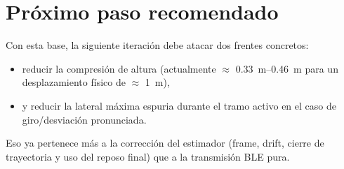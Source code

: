 ﻿\documentclass[11pt,a4paper]{article}
\begin{document}
\section*{Pr\'oximo paso recomendado}
Con esta base, la siguiente iteraci\'on debe atacar dos frentes concretos:
\begin{itemize}[leftmargin=14pt]
  \item reducir la compresi\'on de altura (actualmente \(\approx\) \SIrange{0,33}{0,46}{m} para un desplazamiento f\'isico de \(\approx\) \SI{1}{m}),
  \item y reducir la lateral m\'axima espuria durante el tramo activo en el caso de giro/desviaci\'on pronunciada.
\end{itemize}

Eso ya pertenece m\'as a la correcci\'on del estimador (frame, drift, cierre de trayectoria y uso del reposo final) que a la transmisi\'on BLE pura.
\end{document}
